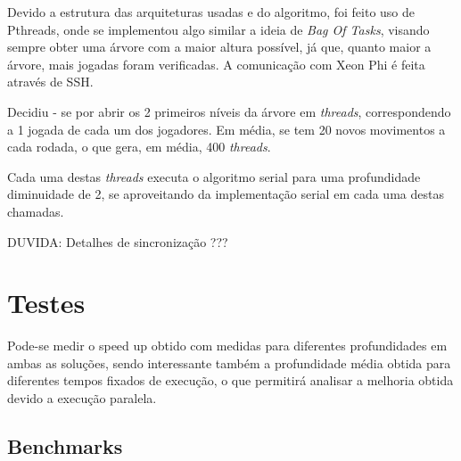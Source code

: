 \documentclass[12pt,a4paper,final]{article}
\begin{document}
Devido a estrutura das arquiteturas usadas e do algoritmo, foi feito uso de Pthreads, onde se implementou algo similar a ideia de \textit{Bag Of Tasks}, visando sempre obter uma árvore com a maior altura possível, já que, quanto maior a árvore, mais jogadas foram verificadas. A comunicação com Xeon Phi é feita através de SSH.

Decidiu - se por abrir os 2 primeiros níveis da árvore em \textit{threads}, correspondendo a 1 jogada de cada um dos jogadores. Em média, se tem 20 novos movimentos a cada rodada, o que gera, em média, 400 \textit{threads}.

Cada uma destas \textit{threads} executa o algoritmo serial para uma profundidade diminuidade de 2, se aproveitando da implementação serial em cada uma destas chamadas.


DUVIDA: Detalhes de sincronização ???

\section{Testes}

Pode-se medir o speed up obtido com medidas para diferentes profundidades em ambas as soluções, sendo interessante também a profundidade média obtida para diferentes tempos fixados de execução, o que permitirá analisar a melhoria obtida devido a execução paralela.

\subsection{Benchmarks}


%  
%
%
\end{document}
